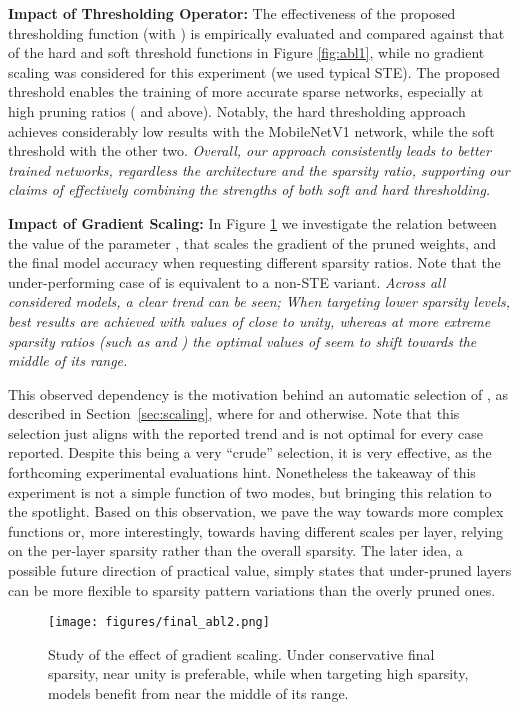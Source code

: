 \documentclass{article}
\begin{document}
\noindent \textbf{Impact of Thresholding Operator:} 
\noindent The effectiveness of the proposed thresholding function (with ) is empirically evaluated and compared against that of the hard and soft threshold functions in Figure \ref{fig:abl1}, while no gradient scaling was considered for this experiment (we used typical STE). The proposed threshold enables the training of more accurate sparse networks, especially at high pruning ratios ( and above). Notably, the hard thresholding approach achieves considerably low results with the MobileNetV1 network, while the soft threshold with the other two. 
\textit{Overall, our approach consistently leads to better trained networks, regardless the architecture and the sparsity ratio, supporting our claims of effectively combining the strengths of both soft and hard thresholding.}




\noindent \textbf{Impact of Gradient Scaling:}   
In Figure \ref{fig:abl2} we investigate the relation between the value of the parameter , that scales the gradient of the pruned weights, and the final model accuracy when requesting different sparsity ratios. Note that the under-performing case of  is equivalent to a non-STE variant.
\textit{ Across all considered models, a clear trend can be seen; When targeting lower sparsity levels, best results are achieved with values of  close to unity, whereas at more extreme sparsity ratios (such as  and ) the optimal values of  seem to shift towards the middle of its range.
}

This observed dependency is the motivation behind an automatic selection of , as described in Section~\ref{sec:scaling}, where  for  and   otherwise. Note that this selection just aligns with the reported trend and is not optimal for every case reported. 
Despite this being a very ``crude'' selection, it is very effective, as the forthcoming experimental evaluations hint.
Nonetheless the takeaway of this experiment is not a simple function of two modes, but bringing this relation to the spotlight.
Based on this observation, we pave the way towards more complex functions or, more interestingly, towards having different scales per layer, relying on the per-layer sparsity rather than the overall sparsity. The later idea, a possible future direction of practical value, simply states that under-pruned layers can be more flexible to sparsity pattern variations than the overly pruned ones. 



\begin{figure}[H]
	\centering
  \texttt{[image: figures/final\_abl2.png]}
\caption{Study of the effect of gradient scaling. Under conservative final sparsity,  near unity is preferable, while when targeting high sparsity, models benefit from  near the middle of its range.}
\label{fig:abl2}
\end{figure}
\end{document}

